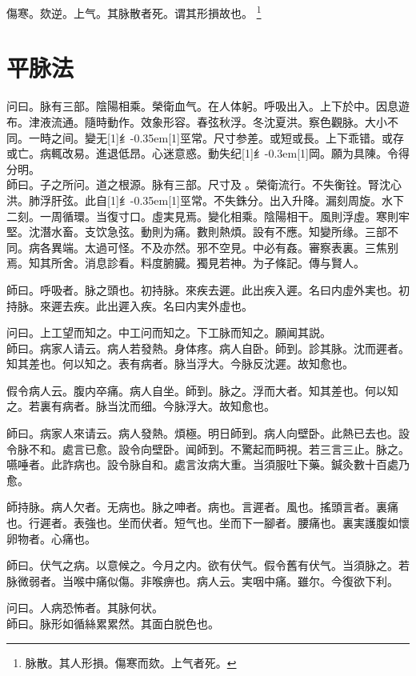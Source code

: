 \documentclass[oneside,b4paper]{ctexbook}
\begin{document}
\begin{flushleft}
傷寒。欬逆。上气。其脉散者死。谓其形損故也。
\footnote{脉散。其人形損。傷寒而欬。上气者死。}

\chapter{平脉法}

问曰。脉有三部。陰陽相乘。榮衛血气。在人体躬。呼吸出入。上下於中。因息遊布。津液流通。隨時動作。效象形容。春弦秋浮。冬沈夏洪。察色觀脉。大小不同。一時之间。變无{\hbox{\scalebox{0.68}[1]{纟}\kern-0.35em\scalebox{0.64}[1]{巠}}}常。尺寸参差。或短或長。上下乖错。或存或亡。病輒改易。進退低昂。心迷意惑。動失纪{\hbox{\scalebox{0.6}[1]{纟}\kern-0.3em\scalebox{0.63}[1]{岡}}}。願为具陳。令得分明。\\
師曰。子之所问。道之根源。脉有三部。尺寸及{𬮦}。榮衛流行。不失衡铨。腎沈心洪。肺浮肝弦。此自{\hbox{\scalebox{0.68}[1]{纟}\kern-0.35em\scalebox{0.64}[1]{巠}}}常。不失銖分。出入升降。漏刻周旋。水下二刻。一周循環。当復寸口。虛実見焉。變化相乘。陰陽相干。風則浮虛。寒則牢堅。沈潛水畜。支饮急弦。動則为痛。數則熱煩。設有不應。知變所缘。三部不同。病各異端。太過可怪。不及亦然。邪不空見。中必有姦。審察表裏。三焦别焉。知其所舍。消息診看。料度腑臓。獨見若神。为子條記。傳与賢人。

師曰。呼吸者。脉之頭也。初持脉。來疾去遲。此出疾入遲。名曰内虛外実也。初持脉。來遲去疾。此出遲入疾。名曰内実外虛也。

问曰。上工望而知之。中工问而知之。下工脉而知之。願闻其説。\\
師曰。病家人请云。病人若發熱。身体疼。病人自卧。師到。診其脉。沈而遲者。知其差也。何以知之。表有病者。脉当浮大。今脉反沈遲。故知愈也。

假令病人云。腹内卒痛。病人自坐。師到。脉之。浮而大者。知其差也。何以知之。若裏有病者。脉当沈而细。今脉浮大。故知愈也。

師曰。病家人來请云。病人發熱。煩極。明日師到。病人向壁卧。此熱已去也。設令脉不和。處言已愈。設令向壁卧。闻師到。不驚起而眄視。若三言三止。脉之。嚥唾者。此詐病也。設令脉自和。處言汝病大重。当須服吐下藥。鍼灸數十百處乃愈。

師持脉。病人欠者。无病也。脉之呻者。病也。言遲者。風也。搖頭言者。裏痛也。行遲者。表強也。坐而伏者。短气也。坐而下一腳者。腰痛也。裏実護腹如懷卵物者。心痛也。

師曰。伏气之病。以意候之。今月之内。欲有伏气。假令舊有伏气。当須脉之。若脉微弱者。当喉中痛似傷。非喉痹也。病人云。実咽中痛。雖尔。今復欲下利。

问曰。人病恐怖者。其脉何状。\\
師曰。脉形如循絲累累然。其面白脱色也。


\end{flushleft}
\end{document}
